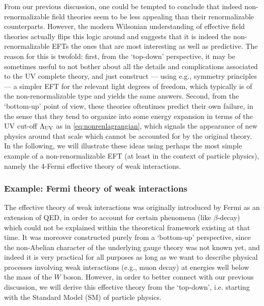 From our previous discussion, one could be tempted to conclude that indeed non-renormalizable field theories seem to be less appealing than their renormalizable counterparts. However, the modern Wilsonian understanding of effective field theories actually flips this logic around and suggests that it is indeed the non-renormalizable EFTs the ones that are most interesting as well as predictive. The reason for this is twofold: first, from the `top-down' perspective, it may be sometimes useful to not bother about all the details and complications associated to the UV complete theory, and just construct --- using e.g., symmetry principles --- a simpler EFT for the relevant light degrees of freedom, which typically is of the non-renormalizable type and yields the same answers. Second, from the `bottom-up' point of view, these theories oftentimes predict their own failure, in the sense that they tend to organize into some energy expansion in terms of the UV cut-off $\Lambda_{\rm UV}$ as in \eqref{eq:nonrenlagrangian}, which signals the appearance of new physics around that scale which cannot be accounted for by the original theory. In the following, we will illustrate these ideas using perhaps the most simple example of a non-renormalizable EFT (at least in the context of particle physics), namely the 4-Fermi effective theory of weak interactions.


\subsubsection*{Example: Fermi theory of weak interactions}

The effective theory of weak interactions was originally introduced by Fermi \cite{Fermi:1934hr} as an extension of QED, in order to account for certain phenomena (like $\beta$-decay) which could not be explained within the theoretical framework existing at that time. It was moreover constructed purely from a `bottom-up' perspective, since the non-Abelian character of the underlying gauge theory was not known yet, and indeed it is very practical for all purposes as long as we want to describe physical processes involving weak interactions (e.g., muon decay) at energies well below the mass of the $W$ boson. However, in order to better connect with our previous discussion, we will derive this effective theory from the `top-down', i.e. starting with the Standard Model (SM) of particle physics.

